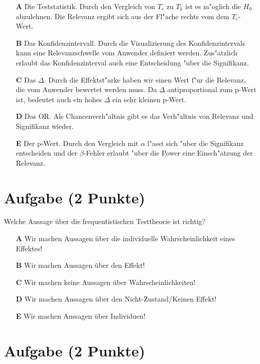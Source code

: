 \documentclass[a4paper, 10pt]{scrartcl}\usepackage[]{graphicx}\usepackage[]{xcolor}
\begin{document}
\begin{enumerate}
\item [\textbf{A} \msquare] Die Teststatistik. Durch den Vergleich von $T_c$ zu $T_k$ ist es m{"o}glich die $H_0$ abzulehnen. Die Relevanz ergibt sich aus der Fl{"a}che rechts vom dem $T_c$-Wert.
\item [\textbf{B} \msquare] Das Konfidenzintervall. Durch die Visualizierung des Konfidenzintervals kann eine Relevanzschwelle vom Anwender definiert werden. Zus{"a}tzlich erlaubt das Konfidenzinterval auch eine Entscheidung {"u}ber die Signifikanz.
\item [\textbf{C} \msquare] Das $\Delta$. Durch die Effektst{"a}rke haben wir einen Wert f{"u}r die Relevanz, die vom Anwender bewertet werden muss. Da $\Delta$ antiproportional zum p-Wert ist, bedeutet auch ein hohes $\Delta$ ein sehr kleinen p-Wert.
\item [\textbf{D} \msquare] Das OR. Als Chancenverh{"a}ltnis gibt es das Verh{"a}ltnis von Relevanz und Signifikanz wieder.
\item [\textbf{E} \msquare] Der p-Wert. Durch den Vergleich mit $\alpha$ l{"a}sst sich {"u}ber die Signifikanz entscheiden und der $\beta$-Fehler erlaubt {"u}ber die Power eine Einsch{"a}tzung der Relevanz.
\end{enumerate}

\section{Aufgabe \hfill (2 Punkte)}



Welche Aussage über die frequentistischen Testtheorie ist richtig?



\begin{enumerate}
\item [\textbf{A} \msquare] Wir machen Aussagen über die individuelle Wahrscheinlichkeit eines Effektes!
\item [\textbf{B} \msquare] Wir machen Aussagen über den Effekt!
\item [\textbf{C} \msquare] Wir machen keine Aussagen über Wahrscheinlichkeiten!
\item [\textbf{D} \msquare] Wir machen Aussagen über den Nicht-Zustand/Keinen Effekt!
\item [\textbf{E} \msquare] Wir machen Aussagen über Individuen!
\end{enumerate}

\section{Aufgabe \hfill (2 Punkte)}
\end{document}
